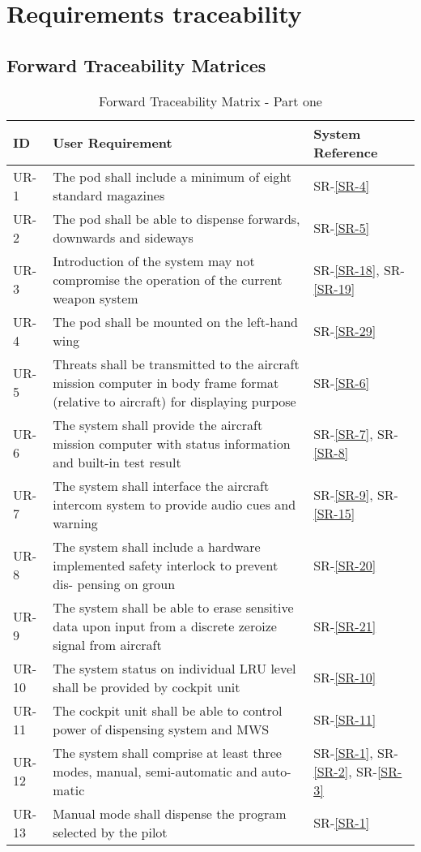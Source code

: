 \documentclass[Main]{subfiles}
\begin{document}
\chapter{Requirements traceability}
\section{Forward Traceability Matrices}
\begin{table}[htbp]
	\centering
	\begin{tabular}{l p{10cm} l} \hline
	ID & User Requirement & System Reference \\\hline
	UR-1 & The pod shall include a minimum of eight standard magazines & SR-\ref{SR-4} \\
	UR-2 & The pod shall be able to dispense forwards, downwards and sideways & SR-\ref{SR-5} \\
	UR-3 & Introduction of the system may not compromise the operation of the current weapon
	system & SR-\ref{SR-18}, SR-\ref{SR-19} \\
	UR-4 & The pod shall be mounted on the left-hand wing & SR-\ref{SR-29} \\
	UR-5 & Threats shall be transmitted to the aircraft mission computer in body frame format
	(relative to aircraft) for displaying purpose & SR-\ref{SR-6} \\
	UR-6 & The system shall provide the aircraft mission computer with status information and
	built-in test result & SR-\ref{SR-7}, SR-\ref{SR-8} \\
	UR-7 & The system shall interface the aircraft intercom system to provide audio cues and
	warning & SR-\ref{SR-9}, SR-\ref{SR-15} \\
	UR-8 & The system shall include a hardware implemented safety interlock to prevent dis-
	pensing on groun & SR-\ref{SR-20} \\
	UR-9 & The system shall be able to erase sensitive data upon input from a discrete zeroize
	signal from aircraft & SR-\ref{SR-21} \\
	UR-10 & The system status on individual LRU level shall be provided by cockpit unit & SR-\ref{SR-10} \\
	UR-11 & The cockpit unit shall be able to control power of dispensing system and MWS & SR-\ref{SR-11} \\
	UR-12 & The system shall comprise at least three modes, manual, semi-automatic and auto-
	matic & SR-\ref{SR-1}, SR-\ref{SR-2}, SR-\ref{SR-3} \\
	UR-13 & Manual mode shall dispense the program selected by the pilot & SR-\ref{SR-1} \\\hline
	\end{tabular}
\caption{Forward Traceability Matrix - Part one}
\label{Tab:ForwardPartOne}
\end{table}
\end{document}
